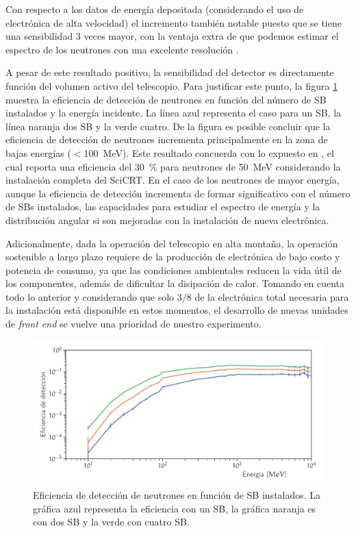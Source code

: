 Con respecto a los datos de energía depositada (considerando el uso de electrónica de alta velocidad) el incremento también notable puesto que se tiene una sensibilidad \num{3} veces mayor, con la ventaja extra de que podemos estimar el espectro de los neutrones con una excelente resolución \cite{ysasai17}.

A pesar de este resultado positivo, la sensibilidad del detector es directamente función del volumen activo del telescopio. Para justificar este punto, la figura \ref{fig:eficiencia-electronica} muestra la eficiencia de detección de neutrones en función del número de SB instalados y la energía incidente. La línea azul representa el caso para un SB, la línea naranja dos SB y la verde cuatro. De la figura es posible concluir que la eficiencia de detección de neutrones incrementa principalmente en la zona de bajas energías ($<$\SI{100}{\mega\electronvolt}). Este resultado concuerda con lo expuesto en \cite{nagaiphd}, el cual reporta una eficiencia del \SI{30}{\percent} para neutrones de \SI{50}{\mega\electronvolt} considerando la instalación completa del SciCRT. En el caso de los neutrones de mayor energía, aunque la eficiencia de detección incrementa de formar significativo con el número de SBs instalados, las capacidades para estudiar el espectro de energía y la distribución angular si son mejoradas con la instalación de nueva electrónica.

Adicionalmente, dada la operación del telescopio en alta montaña, la operación sostenible a largo plazo requiere de la producción de electrónica de bajo costo y potencia de consumo, ya que las condiciones ambientales reducen la vida útil de los componentes, además de dificultar la disipación de calor. Tomando en cuenta todo lo anterior y considerando que solo $3/8$ de la electrónica total necesaria para la instalación está disponible en estos momentos, el desarrollo de nuevas unidades de \emph{front end} se vuelve una prioridad de nuestro experimento.

\begin{figure}
        \centering
        \includegraphics[width=\textwidth]{electronics-deff.pdf}
        \caption{Eficiencia de detección de neutrones en función de SB instalados. La gráfica azul representa la eficiencia con un SB, la gráfica naranja es con dos SB y la verde con cuatro SB.}
        \label{fig:eficiencia-electronica}
\end{figure}

